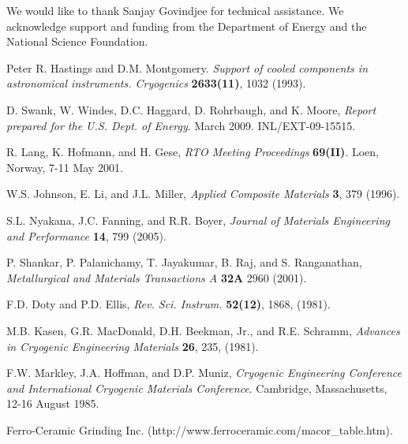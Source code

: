 \documentclass[final]{svjour2}
\begin{document}
\begin{acknowledgements}
We would like to thank Sanjay Govindjee for technical assistance. We acknowledge support and funding from the Department of Energy and the National Science Foundation.
\end{acknowledgements}

\begin{thebibliography}{99}

Peter R. Hastings and D.M. Montgomery. {\it Support of cooled components in astronomical instruments. Cryogenics} \textbf{2633(11)}, 1032 (1993).


D. Swank, W. Windes, D.C. Haggard, D. Rohrbaugh, and K. Moore, {\it Report prepared for the U.S. Dept. of Energy}. March 2009. INL/EXT-09-15515.

R. Lang, K. Hofmann, and H. Gese, {\it RTO Meeting Proceedings} \textbf{69(II)}. Loen, Norway, 7-11 May 2001.

W.S. Johnson, E. Li, and J.L. Miller, {\it Applied Composite Materials} \textbf{3}, 379 (1996).

S.L. Nyakana, J.C. Fanning, and R.R. Boyer, {\it Journal of Materials Engineering and Performance} \textbf{14}, 799 (2005).

P. Shankar, P. Palanichamy, T. Jayakumar, B. Raj, and S. Ranganathan, {\it Metallurgical and Materials Transactions A} \textbf{32A} 2960 (2001).

F.D. Doty and P.D. Ellis, {\it Rev. Sci. Instrum.} \textbf{52(12)}, 1868, (1981).

M.B. Kasen, G.R. MacDonald, D.H. Beekman, Jr., and R.E. Schramm, {\it Advances in Cryogenic Engineering Materials} \textbf{26}, 235, (1981).

F.W. Markley, J.A. Hoffman, and D.P. Muniz, {\it Cryogenic Engineering Conference and International Cryogenic Materials Conference}. Cambridge, Massachusetts, 12-16 August 1985.

Ferro-Ceramic Grinding Inc. (http://www.ferroceramic.com/macor\_table.htm).


\end{thebibliography}
\end{document}
